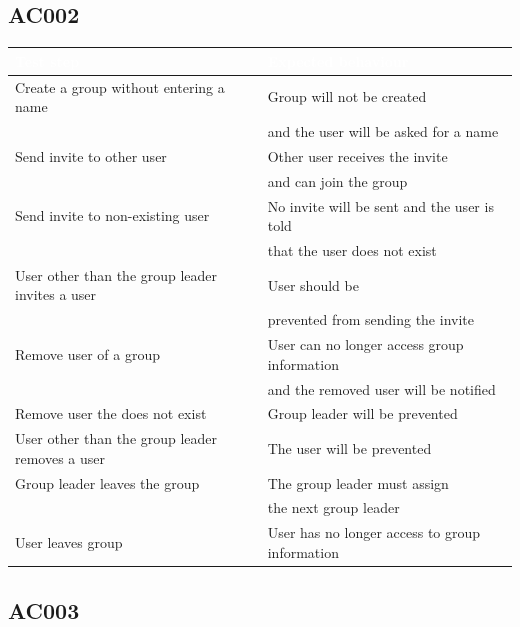 \documentclass[12pt]{article}
\theoremstyle{definition}
\begin{document}
\subsection{AC002}

\begin{tabular}{|l|l|}
\hline
\cellcolor[gray]{0.5}\textcolor{white}{Test step} & \cellcolor[gray]{0.5}\textcolor{white}{Expected behaviour} \\ \hline
Create a group without entering a name & Group will not be created \\ 
 & and the user will be asked for a name \\ \hline
Send invite to other user & Other user receives the invite \\
& and can join the group \\ \hline
Send invite to non-existing user & No invite will be sent and the user is told \\
& that the user does not exist \\ \hline
User other than the group leader invites a user & User should be \\ & prevented from sending the invite \\ \hline
Remove user of a group & User can no longer access group information \\
& and the removed user will be notified \\ \hline
Remove user the does not exist & Group leader will be prevented\\ \hline
User other than the group leader removes a user & The user will be prevented \\ \hline
Group leader leaves the group & The group leader must assign \\
& the next group leader \\ \hline
User leaves group & User has no longer access to group information \\ \hline
\end{tabular}

\subsection{AC003}
\end{document}
